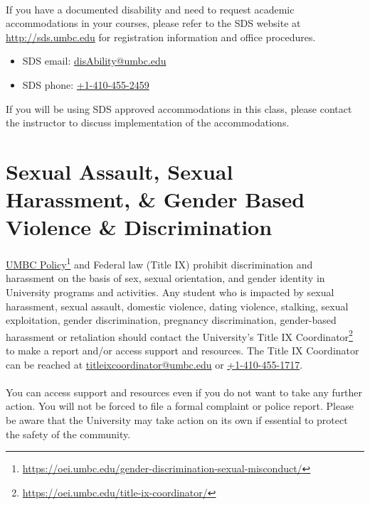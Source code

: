\documentclass[letter,10pt]{article}
\begin{document}
\paragraph{}If you have a documented disability and need to request academic accommodations in your courses, please refer to the SDS website at \url{http://sds.umbc.edu} for registration information and office procedures.
\begin{itemize}
\item SDS email: \href{mailto:disAbility@umbc.edu}{disAbility@umbc.edu}
\item SDS phone: \href{tel:+14104552459}{+1-410-455-2459}
\end{itemize}
If you will be using SDS approved accommodations in this class, please contact the instructor to discuss implementation of the accommodations. %

\section*{Sexual Assault, Sexual Harassment, \& Gender Based Violence \& Discrimination}
\paragraph{}\href{https://ecr.umbc.edu/gender-discrimination-sexual-misconduct/}{UMBC Policy}\footnote{\url{https://oei.umbc.edu/gender-discrimination-sexual-misconduct/}} and Federal law (Title IX) prohibit discrimination and harassment on the basis of sex, sexual orientation, and gender identity in University programs and activities. Any student who is impacted by sexual harassment, sexual assault, domestic violence, dating violence, stalking, sexual exploitation, gender discrimination, pregnancy discrimination, gender-based harassment or retaliation should contact the University’s Title IX Coordinator\footnote{\url{https://oei.umbc.edu/title-ix-coordinator/}} to make a report and/or access support and resources. The Title IX Coordinator can be reached at \href{mailto:titleixcoordinator@umbc.edu?Subject=Title\%20IX}{titleixcoordinator@umbc.edu} or \href{tel:+14104551717}{+1-410-455-1717}.

\paragraph{}You can access support and resources even if you do not want to take any further action. You will not be forced to file a formal complaint or police report. Please be aware that the University may take action on its own if essential to protect the safety of the community.
\end{document}
